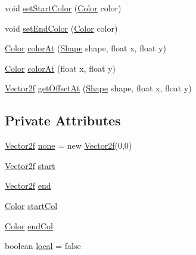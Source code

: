 \begin{DoxyCompactItemize}
\item 
void \mbox{\hyperlink{classorg_1_1newdawn_1_1slick_1_1fills_1_1_gradient_fill_a6b04f30b54b25a86699e3b802a70d3a6}{set\+Start\+Color}} (\mbox{\hyperlink{classorg_1_1newdawn_1_1slick_1_1_color}{Color}} color)
\item 
void \mbox{\hyperlink{classorg_1_1newdawn_1_1slick_1_1fills_1_1_gradient_fill_a870476f2e0a84a105e3cb75e7d0d8fa9}{set\+End\+Color}} (\mbox{\hyperlink{classorg_1_1newdawn_1_1slick_1_1_color}{Color}} color)
\item 
\mbox{\hyperlink{classorg_1_1newdawn_1_1slick_1_1_color}{Color}} \mbox{\hyperlink{classorg_1_1newdawn_1_1slick_1_1fills_1_1_gradient_fill_a22cc3934ac8c799ecb3cf3dced67433d}{color\+At}} (\mbox{\hyperlink{classorg_1_1newdawn_1_1slick_1_1geom_1_1_shape}{Shape}} shape, float x, float y)
\item 
\mbox{\hyperlink{classorg_1_1newdawn_1_1slick_1_1_color}{Color}} \mbox{\hyperlink{classorg_1_1newdawn_1_1slick_1_1fills_1_1_gradient_fill_a055ed4ac3ee35739156de1ba47d24b13}{color\+At}} (float x, float y)
\item 
\mbox{\hyperlink{classorg_1_1newdawn_1_1slick_1_1geom_1_1_vector2f}{Vector2f}} \mbox{\hyperlink{classorg_1_1newdawn_1_1slick_1_1fills_1_1_gradient_fill_a2d031a3de790ce62bc0853c6d76ac9d9}{get\+Offset\+At}} (\mbox{\hyperlink{classorg_1_1newdawn_1_1slick_1_1geom_1_1_shape}{Shape}} shape, float x, float y)
\end{DoxyCompactItemize}
\subsection*{Private Attributes}
\begin{DoxyCompactItemize}
\item 
\mbox{\hyperlink{classorg_1_1newdawn_1_1slick_1_1geom_1_1_vector2f}{Vector2f}} \mbox{\hyperlink{classorg_1_1newdawn_1_1slick_1_1fills_1_1_gradient_fill_aa0146d319086d1ebae9ad675fee8e742}{none}} = new \mbox{\hyperlink{classorg_1_1newdawn_1_1slick_1_1geom_1_1_vector2f}{Vector2f}}(0,0)
\item 
\mbox{\hyperlink{classorg_1_1newdawn_1_1slick_1_1geom_1_1_vector2f}{Vector2f}} \mbox{\hyperlink{classorg_1_1newdawn_1_1slick_1_1fills_1_1_gradient_fill_ae0e8a44c266db0e41cd213938c031ced}{start}}
\item 
\mbox{\hyperlink{classorg_1_1newdawn_1_1slick_1_1geom_1_1_vector2f}{Vector2f}} \mbox{\hyperlink{classorg_1_1newdawn_1_1slick_1_1fills_1_1_gradient_fill_ad061e535f20522d5170bfad1354480c6}{end}}
\item 
\mbox{\hyperlink{classorg_1_1newdawn_1_1slick_1_1_color}{Color}} \mbox{\hyperlink{classorg_1_1newdawn_1_1slick_1_1fills_1_1_gradient_fill_a7d7a0f4539c16030b77f9b8dc06a5509}{start\+Col}}
\item 
\mbox{\hyperlink{classorg_1_1newdawn_1_1slick_1_1_color}{Color}} \mbox{\hyperlink{classorg_1_1newdawn_1_1slick_1_1fills_1_1_gradient_fill_adcf5fb0ed0705120166e3ae2fd6ab352}{end\+Col}}
\item 
boolean \mbox{\hyperlink{classorg_1_1newdawn_1_1slick_1_1fills_1_1_gradient_fill_a7a4a465395d82931471d74116cfb9b3b}{local}} = false
\end{DoxyCompactItemize}


